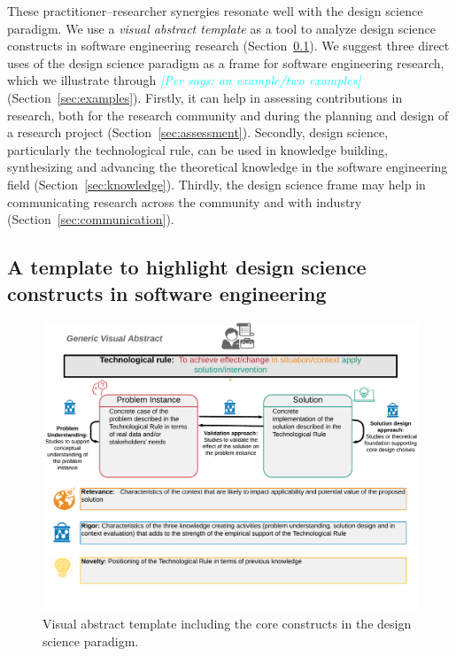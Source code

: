\documentclass[graybox]{svmult}
\newcommand{\per}[1]{\textcolor{cyan}{{\it [Per says: #1]}}}
\newcommand{\per}[1]{}
\begin{document}
These practitioner--researcher synergies resonate well with the design science paradigm.  We use a \emph{visual abstract template} as a tool to analyze design science constructs in software engineering research (Section~\ref{sec:VA_template}). We suggest three direct uses of the design science paradigm as a frame for software engineering research, which we illustrate through \per{an example/two examples}(Section~\ref{sec:examples}). Firstly, it can help in assessing contributions in research, both for the research community and during the planning and design of a research project (Section~\ref{sec:assessment}). Secondly, design science, particularly the technological rule, can be used in knowledge building, synthesizing and advancing the theoretical knowledge in the software engineering field (Section~\ref{sec:knowledge}). Thirdly, the design science frame may help in communicating research across the community and with industry (Section~\ref{sec:communication}). 


\subsection{A template to highlight design science constructs in software engineering}
\label{sec:VA_template}


\begin{figure}[t]
  \includegraphics[width=1.0\textwidth]{Figures/GenericVA.png}
\caption{Visual abstract template including the core constructs in the design science paradigm.}
\label{fig:VA-template}       %
\end{figure}
\end{document}
